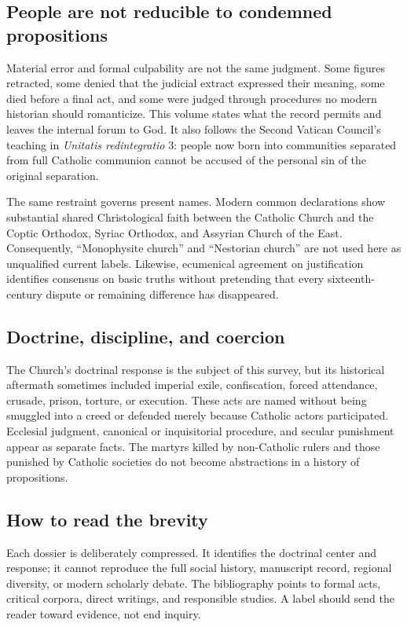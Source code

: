 {\subsection{People are not reducible to condemned propositions}

Material error and formal culpability are not the same judgment. Some figures retracted, some denied that the judicial extract expressed their meaning, some died before a final act, and some were judged through procedures no modern historian should romanticize. This volume states what the record permits and leaves the internal forum to God. It also follows the Second Vatican Council's teaching in \emph{Unitatis redintegratio} 3: people now born into communities separated from full Catholic communion cannot be accused of the personal sin of the original separation.

The same restraint governs present names. Modern common declarations show substantial shared Christological faith between the Catholic Church and the Coptic Orthodox, Syriac Orthodox, and Assyrian Church of the East. Consequently, ``Monophysite church'' and ``Nestorian church'' are not used here as unqualified current labels. Likewise, ecumenical agreement on justification identifies consensus on basic truths without pretending that every sixteenth-century dispute or remaining difference has disappeared.

\subsection{Doctrine, discipline, and coercion}

The Church's doctrinal response is the subject of this survey, but its historical aftermath sometimes included imperial exile, confiscation, forced attendance, crusade, prison, torture, or execution. These acts are named without being smuggled into a creed or defended merely because Catholic actors participated. Ecclesial judgment, canonical or inquisitorial procedure, and secular punishment appear as separate facts. The martyrs killed by non-Catholic rulers and those punished by Catholic societies do not become abstractions in a history of propositions.

\subsection{How to read the brevity}

Each dossier is deliberately compressed. It identifies the doctrinal center and response; it cannot reproduce the full social history, manuscript record, regional diversity, or modern scholarly debate. The bibliography points to formal acts, critical corpora, direct writings, and responsible studies. A label should send the reader toward evidence, not end inquiry.

}
